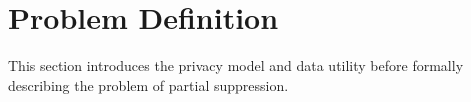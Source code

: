 \section{Problem Definition}
\label{sec:prob}

This section
introduces the privacy model and data utility before formally describing
the problem of partial suppression.

